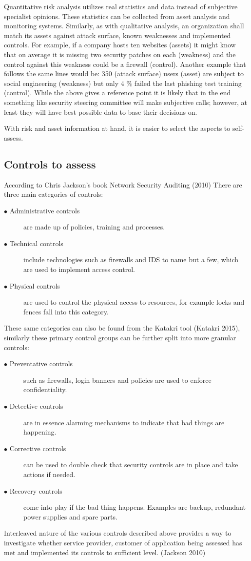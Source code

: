 \documentclass{article}
\begin{document}
\par
Quantitative risk analysis utilizes real statistics and data instead of subjective specialist opinions. These statistics can be collected from asset analysis and monitoring systems.
Similarly, as with qualitative analysis, an organization shall match its assets against attack surface, known weaknesses and implemented controls. For example, if a company hosts ten websites (assets) it might know that on average it is missing two security patches on each (weakness) and the control against this weakness could be a firewall (control). Another example that follows the same lines would be: 350 (attack surface) users (asset) are subject to social engineering (weakness) but only 4 \% failed the last phishing test training (control).
While the above gives a reference point it is likely that in the end something like security steering committee will make subjective calls; however, at least they will have best possible data to base their decisions on.
\par
With risk and asset information at hand, it is easier to select the aspects to self-assess. 
\subsection{Controls to assess}
According to Chris Jackson's book Network Security Auditing (2010) There are three main categories of controls:
\begin{description}
	\item[$\bullet$ Administrative controls] are made up of policies, training and processes.
	\item[$\bullet$ Technical controls] include technologies such as firewalls and IDS to name but a few, which are used to implement access control.
	\item[$\bullet$ Physical controls] are used to control the physical access to resources, for example locks and fences fall into this category.
\end{description}
These same categories can also be found from the Katakri tool (Katakri 2015), similarly these primary control groups can be further split into more granular controls:
\begin{description}
	\item[$\bullet$ Preventative controls] such as firewalls, login banners and policies are used to enforce confidentiality.
	\item[$\bullet$ Detective controls] are in essence alarming mechanisms to indicate that bad things are happening.
	\item[$\bullet$ Corrective controls] can be used to double check that security controls are in place and take actions if needed.
	\item[$\bullet$ Recovery controls] come into play if the bad thing happens. Examples are backup, redundant power supplies and spare parts.
\end{description}
Interleaved nature of the various controls described above provides a way to investigate whether service provider, customer of application being assessed has met and implemented its controls to sufficient level. (Jackson 2010)
\break
\end{document}
